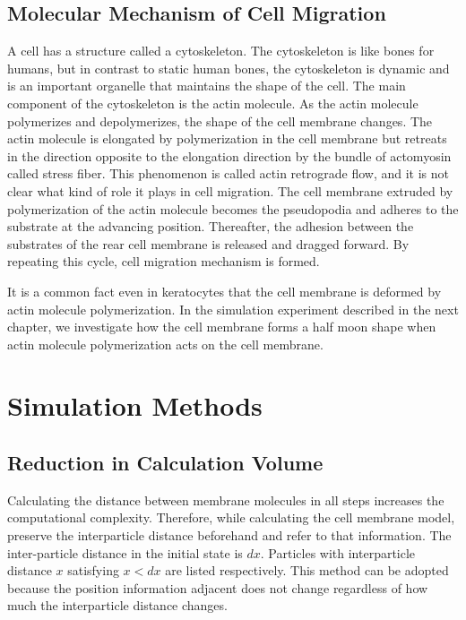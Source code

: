 \documentclass[a4paper,12pt]{book}
\begin{document}
\section{Molecular Mechanism of Cell Migration}
A cell has a structure called a cytoskeleton. The cytoskeleton is like bones for humans, but in contrast to static human bones, the cytoskeleton is dynamic and is an important organelle that maintains the shape of the cell. The main component of the cytoskeleton is the actin molecule. As the actin molecule polymerizes and depolymerizes, the shape of the cell membrane changes. The actin molecule is elongated by polymerization in the cell membrane but retreats in the direction opposite to the elongation direction by the bundle of actomyosin called stress fiber. This phenomenon is called actin retrograde flow, and it is not clear what kind of role it plays in cell migration. The cell membrane extruded by polymerization of the actin molecule becomes the pseudopodia and adheres to the substrate at the advancing position. Thereafter, the adhesion between the substrates of the rear cell membrane is released and dragged forward. By repeating this cycle, cell migration mechanism is formed.

It is a common fact even in keratocytes that the cell membrane is deformed by actin molecule polymerization. In the simulation experiment described in the next chapter, we investigate how the cell membrane forms a half moon shape when actin molecule polymerization acts on the cell membrane.


\chapter{Simulation Methods}
\section{Reduction in Calculation Volume}
Calculating the distance between membrane molecules in all steps increases the computational complexity. Therefore, while calculating the cell membrane model, preserve the interparticle distance beforehand and refer to that information. The inter-particle distance in the initial state is $dx$. Particles with interparticle distance $x$ satisfying $x <dx$ are listed respectively. This method can be adopted because the position information adjacent does not change regardless of how much the interparticle distance changes.
\end{document}
